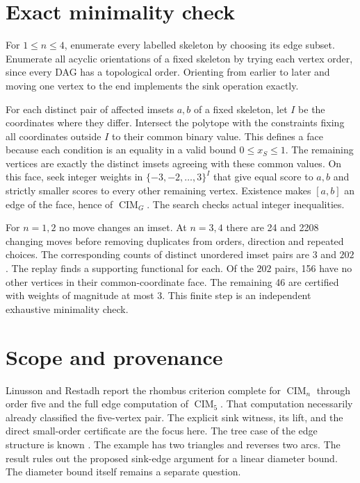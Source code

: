 \documentclass[11pt]{amsart}
\newcommand{\CIM}{\operatorname{CIM}}
\begin{document}
\section{Exact minimality check}
For \(1\le n\le4\), enumerate every labelled skeleton by choosing
its edge subset. Enumerate all acyclic orientations of a fixed
skeleton by trying each vertex order, since every DAG has a
topological order. Orienting from earlier to later and moving one
vertex to the end implements the sink operation exactly.

For each distinct pair of affected imsets \(a,b\) of a fixed
skeleton, let \(I\) be the coordinates where they differ.
Intersect the polytope with the constraints fixing all coordinates
outside \(I\) to their common binary value. This defines a face
because each condition is an equality in a valid bound \(0\le
x_S\le1\). The remaining vertices are exactly the distinct imsets
agreeing with these common values. On this face, seek integer weights
in \(\{-3,-2,\ldots,3\}^{I}\) that give equal score to \(a,b\) and
strictly smaller scores to every other remaining vertex. Existence
makes \([a,b]\) an edge of the face, hence of \(\CIM_G\).
The search checks actual integer inequalities.

For \(n=1,2\) no move changes an imset. At \(n=3,4\) there are
24 and 2208 changing moves before removing duplicates from orders,
direction and repeated choices. The corresponding counts of
distinct unordered imset pairs are \(3\) and \(202\). The replay
finds a supporting functional for each. Of the \(202\) pairs, 156
have no other vertices in their common-coordinate face. The
remaining 46 are certified with weights of magnitude at most 3.
This finite step is an independent exhaustive minimality check.

\clearpage
\section{Scope and provenance}
Linusson and Restadh \cite[Secs.~3 and 5]{rhombus} report the
rhombus criterion complete for \(\CIM_n\) through order five
and the full edge computation of \(\CIM_5\). That computation
necessarily already classified the five-vertex pair. The explicit
sink witness, its lift, and the direct small-order certificate are
the focus here. The tree case of the edge structure is known
\cite{edges}. The example has two triangles and reverses two arcs.
The result rules out the proposed sink-edge argument for a linear
diameter bound. The diameter bound itself remains a separate question.
\end{document}
